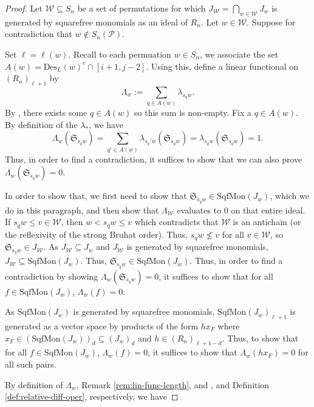 \begin{proof}
    Let $\mathcal{W}\subseteq S_n$ be a set of permutations for which $J_{\mathcal{W}} = \bigcap_{w\in\mathcal W} J_w$ is generated by squarefree monomials as an ideal of $R_n$.
    Let $w\in\mathcal{W}$.
    Suppose for contradiction that $w\not\in S_n(\mathcal{P})$.

    Set \(\ell=\ell(w)\). 
    Recall to each permuation $w\in S_n$, we associate the set $A(w)=\mathrm{Des}_L(w)^c\cap[i+1,j-2]$.
    Using this, define a linear functional on \((R_n)_{\ell+1}\) by 
    \[  \Lambda_w:=\sum_{q\in A(w)}\lambda_{s_qw}. \]
    By , there exists some $q\in A(w)$ so this sum is non-empty.
    Fix a $q\in A(w)$.
    By definition of the $\lambda_*$, we have
    \[ \Lambda_w(\mathfrak{S}_{s_qw})=\sum_{q'\in A(w)}\lambda_{s_q'w}(\mathfrak{S}_{s_qw}) = \lambda_{s_qw}(\mathfrak{S}_{s_qw})=1. \]
    Thus, in order to find a contradiction, it suffices to show that we can also prove $\Lambda_w(\mathfrak{S}_{s_qw}) = 0$.


    In order to show that, we first need to show that $\mathfrak{S}_{s_qw}\in \mathrm{SqfMon}(J_w)$, which we do in this paragraph, and then show that $\Lambda_\mathcal{W}$ evaluates to $0$ on that entire ideal.
    If $s_qw\leq v\in\mathcal{W}$, then $w< s_qw\leq v$ which contradicts that $\mathcal{W}$ is an antichain (or the reflexivity of the strong Bruhat order).
    Thus, $s_qw\not\leq v$ for all $v\in \mathcal{W}$, so $\mathfrak{S}_{s_qw}\in J_{\mathcal{W}}$.
    As $J_{\mathcal{W}}\subseteq J_w$ and $J_{\mathcal{W}}$ is generated by squarefree monomials, $J_{\mathcal{W}}\subseteq \mathrm{SqfMon}(J_w)$.
    Thus, $\mathfrak{S}_{s_qw}\in \mathrm{SqfMon}(J_w)$.
    Thus, in order to find a contradiction by showing $\Lambda_w(\mathfrak{S}_{s_qw}) = 0$, it suffices to show that for all $f\in \mathrm{SqfMon}(J_w)$,  $\Lambda_{w}(f) = 0$.
    
    As $\mathrm{SqfMon}(J_w)$ is generated by squarefree monomials, $\mathrm{SqfMon}(J_w)_{\ell+1}$ is generated as a vector space by products of the form $hx_F$ where $x_F\in \left(\mathrm{SqfMon}(J_w)\right)_d \subseteq (J_w)_d$  and $h\in (R_n)_{\ell+1-d}$.
    Thus, to show that for all $f\in \mathrm{SqfMon}(J_w)$,  $\Lambda_{w}(f) = 0$, it suffices to show that $\Lambda_{w}(hx_F) = 0$ for all such pairs.

    By definition of $\Lambda_w$,  Remark \ref{rem:lin-func-length}, and \cite[Formula (2.7)]{Macdonald}, and Definition \ref{def:relative-diff-oper}, respectively, we have


\end{proof}
